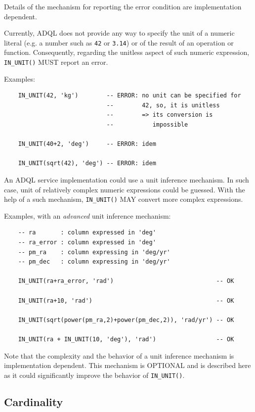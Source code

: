 \documentclass[11pt,a4paper]{ivoa}
\begin{document}
Details of the mechanism for reporting the error condition are implementation
dependent.

Currently, ADQL does not provide any way to specify the unit of a numeric
literal (e.g. a number such as \verb:42: or \verb:3.14:) or of the result of an
operation or function. Consequently, regarding the unitless aspect of such
numeric expression, \verb:IN_UNIT(): MUST report an error.

Examples:

\begin{verbatim}
    IN_UNIT(42, 'kg')        -- ERROR: no unit can be specified for
                             --        42, so, it is unitless
                             --        => its conversion is
                             --           impossible

    IN_UNIT(40+2, 'deg')     -- ERROR: idem

    IN_UNIT(sqrt(42), 'deg') -- ERROR: idem
\end{verbatim}

An ADQL service implementation could use a unit inference mechanism. In such
case, unit of relatively complex numeric expressions could be guessed. With the
help of a such mechanism, \verb:IN_UNIT(): MAY convert more complex
expressions.

Examples, with an \emph{advanced} unit inference mechanism:

\begin{verbatim}
    -- ra       : column expressed in 'deg'
    -- ra_error : column expressed in 'deg'
    -- pm_ra    : column expressing in 'deg/yr'
    -- pm_dec   : column expressing in 'deg/yr'

    IN_UNIT(ra+ra_error, 'rad')                             -- OK

    IN_UNIT(ra+10, 'rad')                                   -- OK

    IN_UNIT(sqrt(power(pm_ra,2)+power(pm_dec,2)), 'rad/yr') -- OK

    IN_UNIT(ra + IN_UNIT(10, 'deg'), 'rad')                 -- OK
\end{verbatim}

Note that the complexity and the behavior of a unit inference mechanism is
implementation dependent. This mechanism is OPTIONAL and is described here
as it could significantly improve the behavior of \verb:IN_UNIT():.

\subsection{Cardinality}
\label{sec:cardinality}
\end{document}
